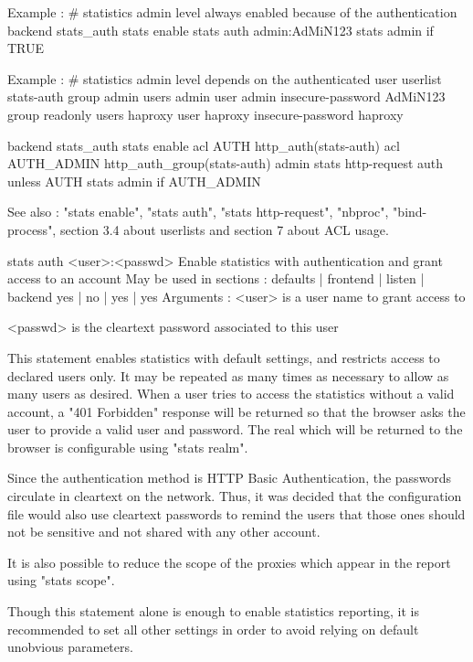   Example :
    # statistics admin level always enabled because of the authentication
    backend stats_auth
        stats enable
        stats auth  admin:AdMiN123
        stats admin if TRUE

  Example :
    # statistics admin level depends on the authenticated user
    userlist stats-auth
        group admin    users admin
        user  admin    insecure-password AdMiN123
        group readonly users haproxy
        user  haproxy  insecure-password haproxy

    backend stats_auth
        stats enable
        acl AUTH       http_auth(stats-auth)
        acl AUTH_ADMIN http_auth_group(stats-auth) admin
        stats http-request auth unless AUTH
        stats admin if AUTH_ADMIN

  See also : "stats enable", "stats auth", "stats http-request", "nbproc",
             "bind-process", section 3.4 about userlists and section 7 about
             ACL usage.


stats auth <user>:<passwd>
  Enable statistics with authentication and grant access to an account
  May be used in sections :   defaults | frontend | listen | backend
                                 yes   |    no    |   yes  |   yes
  Arguments :
    <user>    is a user name to grant access to

    <passwd>  is the cleartext password associated to this user

  This statement enables statistics with default settings, and restricts access
  to declared users only. It may be repeated as many times as necessary to
  allow as many users as desired. When a user tries to access the statistics
  without a valid account, a "401 Forbidden" response will be returned so that
  the browser asks the user to provide a valid user and password. The real
  which will be returned to the browser is configurable using "stats realm".

  Since the authentication method is HTTP Basic Authentication, the passwords
  circulate in cleartext on the network. Thus, it was decided that the
  configuration file would also use cleartext passwords to remind the users
  that those ones should not be sensitive and not shared with any other account.

  It is also possible to reduce the scope of the proxies which appear in the
  report using "stats scope".

  Though this statement alone is enough to enable statistics reporting, it is
  recommended to set all other settings in order to avoid relying on default
  unobvious parameters.

